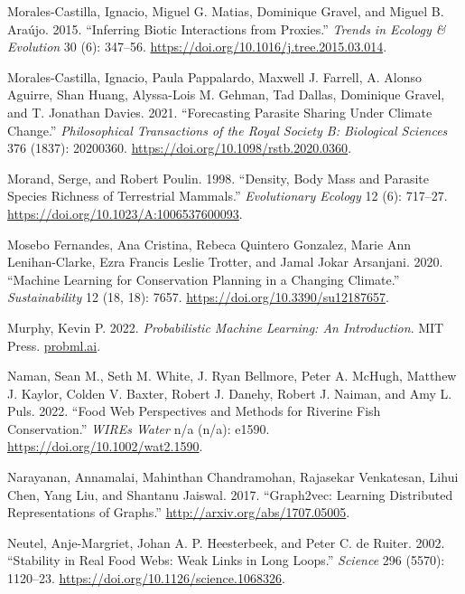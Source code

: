 \documentclass[
  letterpaper,
  DIV=11,
  numbers=noendperiod]{scrartcl}
\newlength{\cslhangindent}
\newlength{\cslentryspacingunit} %
\newenvironment{CSLReferences}[2] %
 {%
  \setlength{\parindent}{0pt}
  \ifodd #1
  \let\oldpar\par
  \def\par{\hangindent=\cslhangindent\oldpar}
  \fi
  \setlength{\parskip}{#2\cslentryspacingunit}
 }%
 {}
\begin{document}
\begin{CSLReferences}{1}{0}
\leavevmode{}%
Morales-Castilla, Ignacio, Miguel G. Matias, Dominique Gravel, and
Miguel B. Araújo. 2015. {``Inferring Biotic Interactions from
Proxies.''} \emph{Trends in Ecology \& Evolution} 30 (6): 347--56.
\url{https://doi.org/10.1016/j.tree.2015.03.014}.

\leavevmode{}%
Morales-Castilla, Ignacio, Paula Pappalardo, Maxwell J. Farrell, A.
Alonso Aguirre, Shan Huang, Alyssa-Lois M. Gehman, Tad Dallas, Dominique
Gravel, and T. Jonathan Davies. 2021. {``Forecasting Parasite Sharing
Under Climate Change.''} \emph{Philosophical Transactions of the Royal
Society B: Biological Sciences} 376 (1837): 20200360.
\url{https://doi.org/10.1098/rstb.2020.0360}.

\leavevmode{}%
Morand, Serge, and Robert Poulin. 1998. {``Density, Body Mass and
Parasite Species Richness of Terrestrial Mammals.''} \emph{Evolutionary
Ecology} 12 (6): 717--27. \url{https://doi.org/10.1023/A:1006537600093}.

\leavevmode{}%
Mosebo Fernandes, Ana Cristina, Rebeca Quintero Gonzalez, Marie Ann
Lenihan-Clarke, Ezra Francis Leslie Trotter, and Jamal Jokar Arsanjani.
2020. {``Machine {Learning} for {Conservation Planning} in a {Changing
Climate}.''} \emph{Sustainability} 12 (18, 18): 7657.
\url{https://doi.org/10.3390/su12187657}.

\leavevmode{}%
Murphy, Kevin P. 2022. \emph{Probabilistic Machine Learning: {An}
Introduction}. {MIT Press}. \href{https://probml.ai}{probml.ai}.

\leavevmode{}%
Naman, Sean M., Seth M. White, J. Ryan Bellmore, Peter A. McHugh,
Matthew J. Kaylor, Colden V. Baxter, Robert J. Danehy, Robert J. Naiman,
and Amy L. Puls. 2022. {``Food Web Perspectives and Methods for Riverine
Fish Conservation.''} \emph{WIREs Water} n/a (n/a): e1590.
\url{https://doi.org/10.1002/wat2.1590}.

\leavevmode{}%
Narayanan, Annamalai, Mahinthan Chandramohan, Rajasekar Venkatesan,
Lihui Chen, Yang Liu, and Shantanu Jaiswal. 2017. {``Graph2vec:
{Learning Distributed Representations} of {Graphs}.''}
\url{http://arxiv.org/abs/1707.05005}.

\leavevmode{}%
Neutel, Anje-Margriet, Johan A. P. Heesterbeek, and Peter C. de Ruiter.
2002. {``Stability in {Real Food Webs}: {Weak Links} in {Long Loops}.''}
\emph{Science} 296 (5570): 1120--23.
\url{https://doi.org/10.1126/science.1068326}.


\end{CSLReferences}
\end{document}
